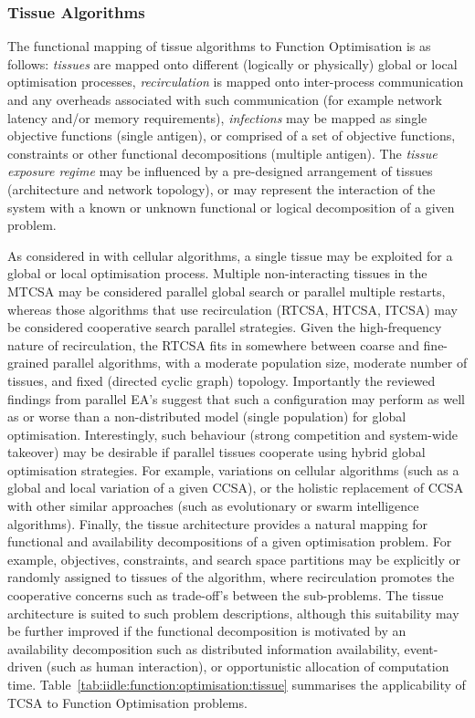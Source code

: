 %
%
\subsubsection{Tissue Algorithms}
\label{subsec:iidle:function:optimization:applicability:tissues}
The functional mapping of tissue algorithms to Function Optimisation is as follows: \emph{tissues} are mapped onto different (logically or physically) global or local optimisation processes, \emph{recirculation} is mapped onto inter-process communication and any overheads associated with such communication (for example network latency and/or memory requirements), \emph{infections} may be mapped as single objective functions (single antigen), or comprised of a set of objective functions, constraints or other functional decompositions (multiple antigen). The \emph{tissue exposure regime} may be influenced by a pre-designed arrangement of tissues (architecture and network topology), or may represent the interaction of the system with a known or unknown functional or logical decomposition of a given problem.

As considered in with cellular algorithms, a single tissue may be exploited for a global or local optimisation process. Multiple non-interacting tissues in the MTCSA may be considered parallel global search or parallel multiple restarts, whereas those algorithms that use recirculation (RTCSA, HTCSA, ITCSA) may be considered cooperative search parallel strategies.
Given the high-frequency nature of recirculation, the RTCSA fits in somewhere between coarse and fine-grained parallel algorithms, with a moderate population size, moderate number of tissues, and fixed (directed cyclic graph) topology. Importantly the reviewed findings from parallel EA's suggest that such a configuration may perform as well as or worse than a non-distributed model (single population) for global optimisation. 
Interestingly, such behaviour (strong competition and system-wide takeover) may be desirable if parallel tissues cooperate using hybrid global optimisation strategies. For example, variations on cellular algorithms (such as a global and local variation of a given CCSA), or the holistic replacement of CCSA with other similar approaches (such as evolutionary or swarm intelligence algorithms).
Finally, the tissue architecture provides a natural mapping for functional and availability decompositions of a given optimisation problem. For example, objectives, constraints, and search space partitions may be explicitly or randomly assigned to tissues of the algorithm, where recirculation promotes the cooperative concerns such as trade-off's between the sub-problems. The tissue architecture is suited to such problem descriptions, although this suitability may be further improved if the functional decomposition is motivated by an availability decomposition such as distributed information availability, event-driven (such as human interaction), or opportunistic allocation of computation time. 
Table~\ref{tab:iidle:function:optimisation:tissue} summarises the applicability of TCSA to Function Optimisation problems.

